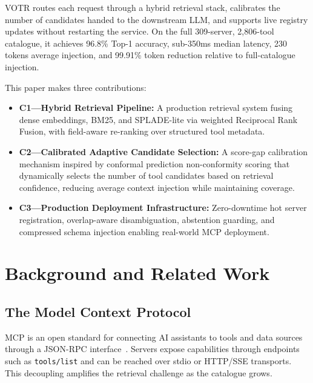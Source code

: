 \documentclass[sigconf,anonymous,review]{acmart}
\newcommand{\votr}{\textsc{VOTR}\xspace}
\begin{document}
\votr routes each request through a hybrid retrieval stack, calibrates the number
of candidates handed to the downstream LLM, and supports live registry updates
without restarting the service.
On the full 309-server, 2,806-tool catalogue, it achieves 96.8\% Top-1 accuracy,
sub-350ms median latency, 230 tokens average injection, and 99.91\% token reduction
relative to full-catalogue injection.

This paper makes three contributions:
\begin{itemize}
\item \textbf{C1---Hybrid Retrieval Pipeline:} A production retrieval system fusing
  dense embeddings, BM25, and SPLADE-lite via weighted Reciprocal Rank Fusion, with
  field-aware re-ranking over structured tool metadata.
\item \textbf{C2---Calibrated Adaptive Candidate Selection:} A score-gap calibration
  mechanism inspired by conformal prediction non-conformity scoring that dynamically
  selects the number of tool candidates based on retrieval confidence, reducing
  average context injection while maintaining coverage.
\item \textbf{C3---Production Deployment Infrastructure:} Zero-downtime hot server
  registration, overlap-aware disambiguation, abstention guarding, and compressed
  schema injection enabling real-world MCP deployment.
\end{itemize}

\section{Background and Related Work}
\label{sec:background}

\subsection{The Model Context Protocol}
MCP is an open standard for connecting AI assistants to tools and data sources
through a JSON-RPC interface~\cite{anthropic_mcp2024}.
Servers expose capabilities through endpoints such as \texttt{tools/list} and can
be reached over stdio or HTTP/SSE transports.
This decoupling amplifies the retrieval challenge as the catalogue grows.
\end{document}
